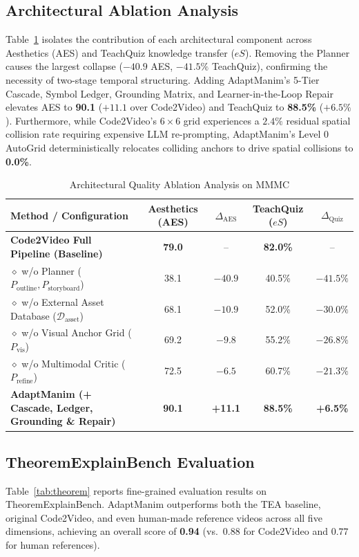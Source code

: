 \documentclass[11pt, a4paper]{article}
\begin{document}
\subsection{Architectural Ablation Analysis}
Table~\ref{tab:ablation} isolates the contribution of each architectural component across Aesthetics (AES) and TeachQuiz knowledge transfer ($eS$). Removing the Planner causes the largest collapse ($-40.9$ AES, $-41.5\%$ TeachQuiz), confirming the necessity of two-stage temporal structuring. Adding AdaptManim's 5-Tier Cascade, Symbol Ledger, Grounding Matrix, and Learner-in-the-Loop Repair elevates AES to \textbf{90.1} ($+11.1$ over Code2Video) and TeachQuiz to \textbf{88.5\%} ($+6.5\%$). Furthermore, while Code2Video's $6\times 6$ grid experiences a $2.4\%$ residual spatial collision rate requiring expensive LLM re-prompting, AdaptManim's Level 0 AutoGrid deterministically relocates colliding anchors to drive spatial collisions to \textbf{0.0\%}.

\begin{table}[htbp]
\centering
\small
\caption{Architectural Quality Ablation Analysis on MMMC}
\label{tab:ablation}
\vspace{0.4em}
\begin{tabular}{l c c c c}
\toprule
\textbf{Method / Configuration} & \textbf{Aesthetics (AES)} & \textbf{$\Delta_{\text{AES}}$} & \textbf{TeachQuiz ($eS$)} & \textbf{$\Delta_{\text{Quiz}}$} \\
\midrule
\textbf{Code2Video Full Pipeline (Baseline)} & \textbf{79.0} & -- & \textbf{82.0\%} & -- \\
$\diamond$ w/o Planner ($P_{\text{outline}}, P_{\text{storyboard}}$) & 38.1 & $-40.9$ & 40.5\% & $-41.5\%$ \\
$\diamond$ w/o External Asset Database ($\mathcal{D}_{\text{asset}}$) & 68.1 & $-10.9$ & 52.0\% & $-30.0\%$ \\
$\diamond$ w/o Visual Anchor Grid ($P_{\text{vis}}$) & 69.2 & $-9.8$ & 55.2\% & $-26.8\%$ \\
$\diamond$ w/o Multimodal Critic ($P_{\text{refine}}$) & 72.5 & $-6.5$ & 60.7\% & $-21.3\%$ \\
\rowcolor{lightgray}
\textbf{AdaptManim (+ Cascade, Ledger, Grounding \& Repair)} & \textbf{90.1} & \textbf{+11.1} & \textbf{88.5\%} & \textbf{+6.5\%} \\
\bottomrule
\end{tabular}
\end{table}

\subsection{TheoremExplainBench Evaluation}
Table~\ref{tab:theorem} reports fine-grained evaluation results on TheoremExplainBench. AdaptManim outperforms both the TEA baseline, original Code2Video, and even human-made reference videos across all five dimensions, achieving an overall score of \textbf{0.94} (vs.\ $0.88$ for Code2Video and $0.77$ for human references).
\end{document}

